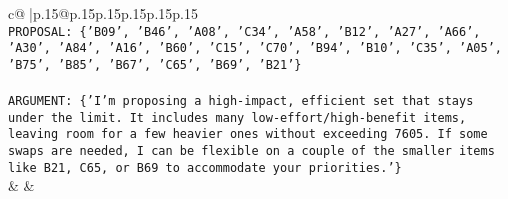 \documentclass{article}
\begin{document}
{\begin{supertabular}{c@{$\;$}|p{.15\linewidth}@{}p{.15\linewidth}p{.15\linewidth}p{.15\linewidth}p{.15\linewidth}p{.15\linewidth}}
{{{\\ 
\texttt{PROPOSAL: \{'B09', 'B46', 'A08', 'C34', 'A58', 'B12', 'A27', 'A66', 'A30', 'A84', 'A16', 'B60', 'C15', 'C70', 'B94', 'B10', 'C35', 'A05', 'B75', 'B85', 'B67', 'C65', 'B69', 'B21'\}} \\
\\ 
\texttt{ARGUMENT: \{'I’m proposing a high{-}impact, efficient set that stays under the limit. It includes many low{-}effort/high{-}benefit items, leaving room for a few heavier ones without exceeding 7605. If some swaps are needed, I can be flexible on a couple of the smaller items like B21, C65, or B69 to accommodate your priorities.'\}} \\
            }
        }
    }
    & & \\ \\


\end{supertabular}}
\end{document}
